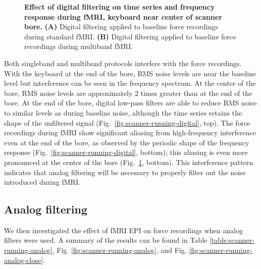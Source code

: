 \documentclass[letterpaper, 10 pt, conference]{ieeeconf}  %
\begin{document}
\begin{figure}[thpb]
  \centering
  \caption{\textbf{Effect of digital filtering on time series and frequency response during fMRI, keyboard near center of scanner bore.} \textbf{(A)} Digital filtering applied to baseline force recordings during standard fMRI. \textbf{(B)} Digital filtering applied to baseline force recordings during multiband fMRI.}
  \label{fig:scanner-running-digital-close}
\end{figure}

Both singleband and multiband protocols interfere with the force recordings. With the keyboard at the end of the bore, RMS noise levels are near the baseline level but interference can be seen in the frequency spectrum. At the center of the bore, RMS noise levels are approximately 2 times greater than at the end of the bore. At the end of the bore, digital low-pass filters are able to reduce RMS noise to similar levels as during baseline noise, although the time series retains the shape of the unfiltered signal (Fig.\ \ref{fig:scanner-running-digital}, top). The force recordings during fMRI show significant aliasing from high-frequency interference even at the end of the bore, as observed by the periodic shape of the frequency response (Fig.\ \ref{fig:scanner-running-digital}, bottom); this aliasing is even more pronounced at the center of the bore (Fig.\ \ref{fig:scanner-running-digital-close}, bottom). This interference pattern indicates that analog filtering will be necessary to properly filter out the noise introduced during fMRI.

\subsection{Analog filtering}

We then investigated the effect of fMRI EPI on force recordings when analog filters were used. A summary of the results can be found in Table \ref{table:scanner-running-analog}, Fig. \ref{fig:scanner-running-analog}, and Fig. \ref{fig:scanner-running-analog-close}.
\end{document}

